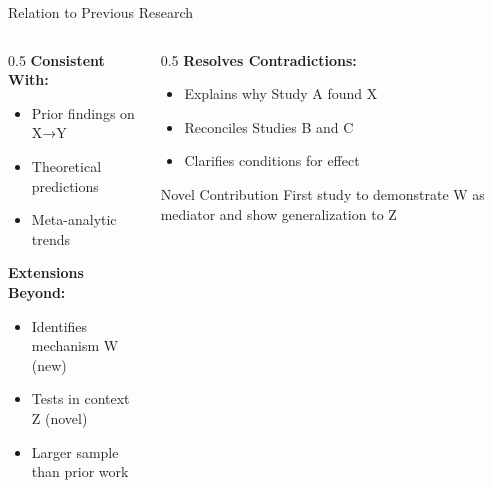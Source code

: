 \documentclass[aspectratio=169,11pt]{beamer}
\begin{document}
\begin{frame}{Relation to Previous Research}
  \begin{columns}[T]

    \begin{column}{0.5\textwidth}
      \textbf{Consistent With:}
      \begin{itemize}
        \item Prior findings on X→Y \cite{jones2020}
        \item Theoretical predictions \cite{smith2019}
        \item Meta-analytic trends \cite{meta2021}
      \end{itemize}

      \vspace{0.5cm}

      \textbf{Extensions Beyond:}
      \begin{itemize}
        \item Identifies mechanism W (new)
        \item Tests in context Z (novel)
        \item Larger sample than prior work
      \end{itemize}
    \end{column}

    \begin{column}{0.5\textwidth}
      \textbf{Resolves Contradictions:}
      \begin{itemize}
        \item Explains why Study A found X
        \item Reconciles Studies B and C
        \item Clarifies conditions for effect
      \end{itemize}

      \vspace{0.5cm}

      \begin{alertblock}{Novel Contribution}
        First study to demonstrate W as mediator and show generalization to Z
      \end{alertblock}
    \end{column}

  \end{columns}
\end{frame}
\end{document}
